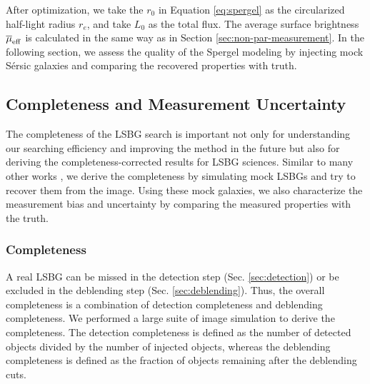 \documentclass[twocolumn,astrosymb,twocolappendix]{aastex631}
\newcommand{\sersic}{S\'ersic}
\begin{document}
\begin{CJK*}{UTF8}{gbsn}
After optimization, we take the $r_0$ in Equation \eqref{eq:spergel} as the circularized half-light radius $r_e$, and take $L_0$ as the total flux. The average surface brightness $\overline{\mu}_{\rm eff}$ is calculated in the same way as in Section \ref{sec:non-par-measurement}. In the following section, we assess the quality of the Spergel modeling by injecting mock \sersic{} galaxies and comparing the recovered properties with truth. 


\subsection{Completeness and Measurement Uncertainty}\label{sec:comp_meas}
The completeness of the LSBG search is important not only for understanding our searching efficiency and improving the method in the future but also for deriving the completeness-corrected results for LSBG sciences. Similar to many other works \citep[e.g.,][]{Zaritsky2021,CarlstenELVES2022,Greene2022}, we derive the completeness by simulating mock LSBGs and try to recover them from the image. Using these mock galaxies, we also characterize the measurement bias and uncertainty by comparing the measured properties with the truth. 


\subsubsection{Completeness}\label{sec:completeness}
A real LSBG can be missed in the detection step (Sec. \ref{sec:detection}) or be excluded in the deblending step (Sec. \ref{sec:deblending}). Thus, the overall completeness is a combination of detection completeness and deblending completeness. We performed a large suite of image simulation to derive the completeness. The detection completeness is defined as the number of detected objects divided by the number of injected objects, whereas the deblending completeness is defined as the fraction of objects remaining after the deblending cuts. 


\end{CJK*}
\end{document}
